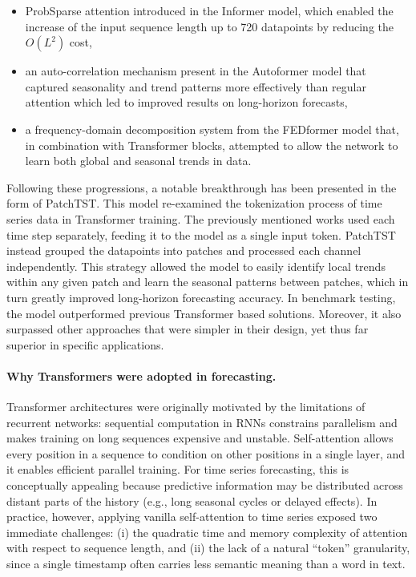 \begin{itemize}
    \item ProbSparse attention introduced in the Informer model, which enabled the increase of the input sequence length up to 720 datapoints by reducing the $O(L^2)$ cost,
    \item an auto-correlation mechanism present in the Autoformer model that captured seasonality and trend patterns more effectively than regular attention which led to improved results on long-horizon forecasts,
    \item a frequency-domain decomposition system from the FEDformer model that, in combination with Transformer blocks, attempted to allow the network to learn both global and seasonal trends in data.
\end{itemize}

Following these progressions, a notable breakthrough has been presented in the form of PatchTST. This model re-examined the tokenization process of time series data in Transformer training. The previously mentioned works used each time step separately, feeding it to the model as a single input token. PatchTST instead grouped the datapoints into patches and processed each channel independently. This strategy allowed the model to easily identify local trends within any given patch and learn the seasonal patterns between patches, which in turn greatly improved long-horizon forecasting accuracy. In benchmark testing, the model outperformed previous Transformer based solutions. Moreover, it also surpassed other approaches that were simpler in their design, yet thus far superior in specific applications.

\paragraph{Why Transformers were adopted in forecasting.}
Transformer architectures were originally motivated by the limitations of recurrent networks: sequential computation in RNNs constrains parallelism and makes training on long sequences expensive and unstable. Self-attention allows every position in a sequence to condition on other positions in a single layer, and it enables efficient parallel training. For time series forecasting, this is conceptually appealing because predictive information may be distributed across distant parts of the history (e.g., long seasonal cycles or delayed effects). In practice, however, applying vanilla self-attention to time series exposed two immediate challenges: (i) the quadratic time and memory complexity of attention with respect to sequence length, and (ii) the lack of a natural ``token'' granularity, since a single timestamp often carries less semantic meaning than a word in text.

